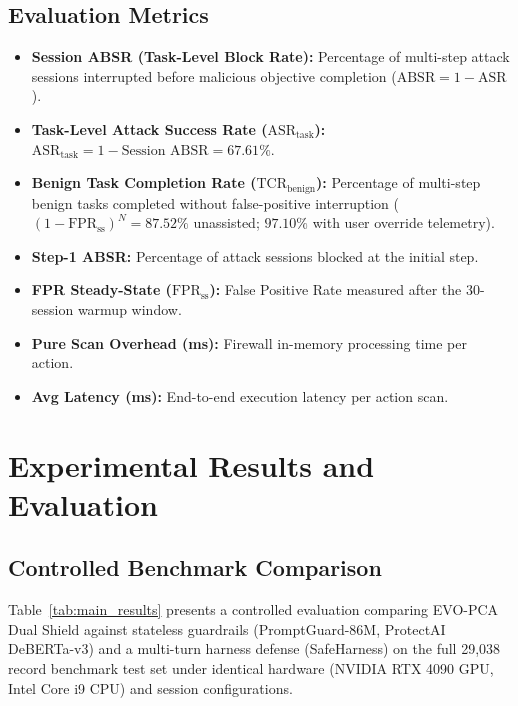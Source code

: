 \documentclass[conference]{IEEEtran}
\begin{document}
\subsection{Evaluation Metrics}
\begin{itemize}
    \item \textbf{Session ABSR (Task-Level Block Rate):} Percentage of multi-step attack sessions interrupted before malicious objective completion ($\text{ABSR} = 1 - \text{ASR}$).
    \item \textbf{Task-Level Attack Success Rate ($\text{ASR}_{\text{task}}$):} $\text{ASR}_{\text{task}} = 1 - \text{Session ABSR} = 67.61\%$.
    \item \textbf{Benign Task Completion Rate ($\text{TCR}_{\text{benign}}$):} Percentage of multi-step benign tasks completed without false-positive interruption ($(1 - \text{FPR}_{\text{ss}})^N = 87.52\%$ unassisted; $97.10\%$ with user override telemetry).
    \item \textbf{Step-1 ABSR:} Percentage of attack sessions blocked at the initial step.
    \item \textbf{FPR Steady-State ($\text{FPR}_{\text{ss}}$):} False Positive Rate measured after the 30-session warmup window.
    \item \textbf{Pure Scan Overhead (ms):} Firewall in-memory processing time per action.
    \item \textbf{Avg Latency (ms):} End-to-end execution latency per action scan.
\end{itemize}

\section{Experimental Results and Evaluation}

\subsection{Controlled Benchmark Comparison}
Table~\ref{tab:main_results} presents a controlled evaluation comparing EVO-PCA Dual Shield against stateless guardrails (PromptGuard-86M, ProtectAI DeBERTa-v3) and a multi-turn harness defense (SafeHarness) on the full 29,038 record benchmark test set under identical hardware (NVIDIA RTX 4090 GPU, Intel Core i9 CPU) and session configurations.
\end{document}
